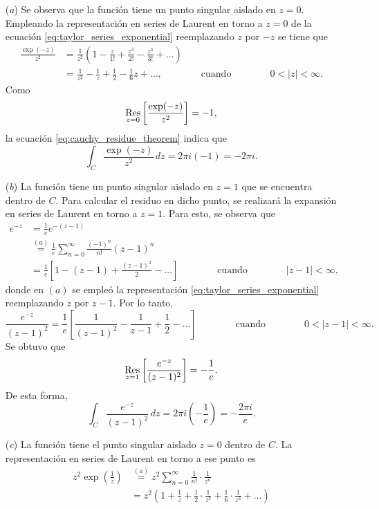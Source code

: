 \documentclass[a4paper]{report}
\def\Res{\qopname\relax m{Res}}
\begin{document}
\begin{enumerate}
 \item[(\textit{a})] Se observa que la función tiene un punto singular aislado en \(z=0\). Empleando la representación en series de Laurent en torno a \(z=0\) de la ecuación \ref{eq:taylor_series_exponential} reemplazando \(z\) por \(-z\) se tiene que 
 \begin{align*}
  \frac{\exp(-z)}{z^2}&=\frac{1}{z^2}\left(1-\frac{z}{1!}+\frac{z^2}{2!}-\frac{z^3}{3!}+\dots\right)\\ 
   &=\frac{1}{z^2}-\frac{1}{z}+\frac{1}{2}-\frac{1}{6}z+\dots,
   \qquad\qquad\textrm{cuando}\qquad\qquad
    0<|z|<\infty.
 \end{align*}
 Como 
 \[
  \Res_{z=0}\left[\frac{\exp(-z)}{z^2}\right]=-1,
 \]
 la ecuación \ref{eq:cauchy_residue_theorem} indica que 
 \[
  \int_C\frac{\exp(-z)}{z^2}\,dz=2\pi i(-1)=-2\pi i.
 \]
 \item[(\textit{b})] La función tiene un punto singular aislado en \(z=1\) que se encuentra dentro de \(C\). Para calcular el residuo en dicho punto, se realizará la expansión en series de Laurent en torno a \(z=1\). Para esto, se observa que 
 \begin{align*}
  e^{-z}&=\frac{1}{e}e^{-(z-1)}\\
   &\overset{(a)}{=}\frac{1}{e}\sum_{n=0}^\infty\frac{(-1)^n}{n!}(z-1)^n\\
   &=\frac{1}{e}\left[1-(z-1)+\frac{(z-1)^2}{2}-\dots\right]
  \qquad\qquad\textrm{cuando}\qquad\qquad
  |z-1|<\infty, 
 \end{align*}
 donde en \((a)\) se empleó la representación \ref{eq:taylor_series_exponential} reemplazando \(z\) por \(z-1\). Por lo tanto,
 \[
  \frac{e^{-z}}{(z-1)^2}=\frac{1}{e}\left[\frac{1}{(z-1)^2}-\frac{1}{z-1}+\frac{1}{2}-\dots\right]
  \qquad\qquad\textrm{cuando}\qquad\qquad
  0<|z-1|<\infty.
 \]
 Se obtuvo que 
 \[
  \Res_{z=1}\left[\frac{e^{-z}}{(z-1)^2}\right]=-\frac{1}{e}.
 \]
 De esta forma,
 \[
  \int_C\frac{e^{-z}}{(z-1)^2}\,dz=2\pi i\left(-\frac{1}{e}\right)=-\frac{2\pi i}{e}.
 \]
 \item[(\textit{c})] La función tiene el punto singular aislado \(z=0\) dentro de \(C\). La representación en series de Laurent en torno a ese punto es 
 \begin{align*}
   z^2\exp\left(\frac{1}{z}\right)&\overset{(a)}{=}z^2\sum_{n=0}^\infty\frac{1}{n!}\cdot\frac{1}{z^n}\\
    &=z^2\left(1+\frac{1}{z}+\frac{1}{2}\cdot\frac{1}{z^2}+\frac{1}{6}\cdot\frac{1}{z^3}+\dots\right)\\

\end{align*}
\end{enumerate}
\end{document}
